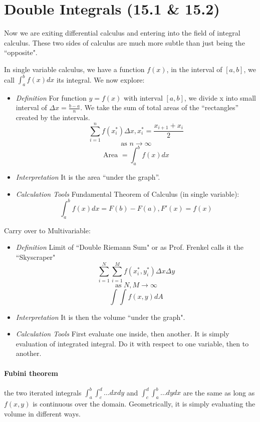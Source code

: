 \documentclass[11pt, oneside]{article}   	%
\begin{document}
\section{Double Integrals (15.1 \& 15.2)}
Now we are exiting differential calculus and entering into the field of integral calculus. These two sides of calculus are much more subtle than just being the ``opposite".

In single variable calculus, we have a function $f(x)$, in the interval of $[a,b]$, we call $\int_{a}^{b}f(x)dx$ its integral. We now explore:

\begin{itemize}
\item \emph{Definition} For function $y = f(x)$ with interval $[a,b]$, we divide x into small interval of $\Delta x = \frac{b-a}{n}$. We take the sum of total areas of the ``rectangles'' created by the intervals. $$\sum_{i=1}^{n} f(x_i^\ast)\Delta x, x_i^\ast = \frac{x_{i+1}+x_i}{2}$$ $$\text{as }n \to \infty$$ $$\text{Area } = \int_{a}^{b}f(x)dx$$
\item \emph{Interpretation} It is the area ``under the graph''.
\item \emph{Calculation Tools} Fundamental Theorem of Calculus (in single variable): $$\int_a^b f(x)dx = F(b) - F(a), F'(x) = f(x)$$
\end{itemize}

Carry over to Multivariable:
\begin{itemize}
\item \emph{Definition} Limit of ``Double Riemann Sum" or as Prof. Frenkel calls it the ``Skyscraper" $$\sum_{i=1}^N \sum_{i=1}^{M} f(x_i^\ast, y_i^\ast) \Delta x \Delta y$$ $$\text{as } N,M \to \infty$$ $$\int \int f(x,y) dA$$
\item \emph{Interpretation} It is then the volume ``under the graph".
\item \emph{Calculation Tools} First evaluate one inside, then another. It is simply evaluation of integrated integral. Do it with respect to one variable, then to another.
\end{itemize}

\paragraph{Fubini theorem} the two iterated integrals $\int_a^b \int_c^d \dots dxdy$ and $\int_c^d \int_a^b \dots dydx$ are the same as long as $f(x,y)$ is continuous over the domain. Geometrically, it is simply evaluating the volume in different ways.
\end{document}
